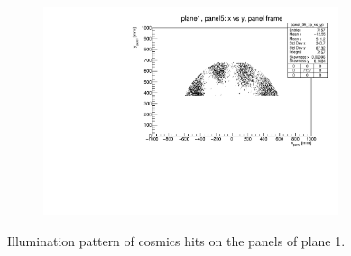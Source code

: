 \begin{figure}[!h]
\begin{subfigure}[b]{0.4\textwidth}
        \label{fig:panel4plane1}
    \end{subfigure}
    \hfill
    \begin{subfigure}[b]{0.4\textwidth}
        \centering
        \includegraphics[width=0.95\textwidth]{figures/pdf/plane1_panel5_x_vs_y_all.pdf}
        \label{fig:panel5plane1}
    \end{subfigure}
       \caption{Illumination pattern of cosmics hits on the panels of plane 1.}
       \label{fig:plane1}
\end{figure}